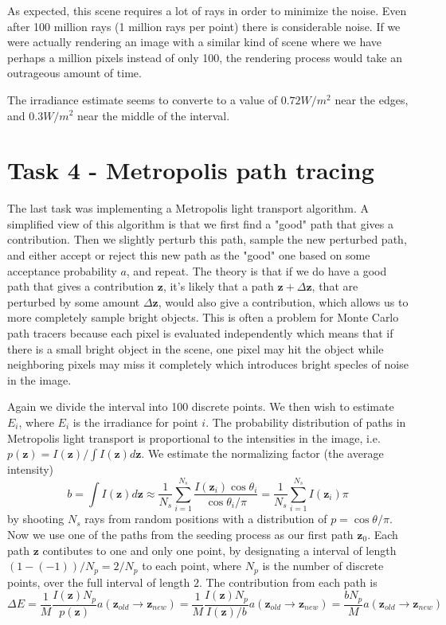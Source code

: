 \documentclass{article} %
\begin{document}
As expected, this scene requires a lot of rays in order to minimize the noise. Even after 100 million rays (1 million rays per point) there is considerable noise. If we were actually rendering an image with a similar kind of scene where we have perhaps a million pixels instead of only 100, the rendering process would take an outrageous amount of time.

The irradiance estimate seems to converte to a value of $0.72W/m^2$ near the edges, and $0.3W/m^2$ near the middle of the interval.



\section*{Task 4 - Metropolis path tracing}
The last task was implementing a Metropolis light transport algorithm. A simplified view of this algorithm is that we first find a "good" path that gives a contribution. Then we slightly perturb this path, sample the new perturbed path, and either accept or reject this new path as the "good" one based on some acceptance probability $a$, and repeat. The theory is that if we do have a good path that gives a contribution $\mathbf{z}$, it's likely that a path $\mathbf{z}+\Delta \mathbf{z}$, that are perturbed by some amount $\Delta \mathbf{z}$, would also give a contribution, which allows us to more completely sample bright objects. This is often a problem for Monte Carlo path tracers because each pixel is evaluated independently which means that if there is a small bright object in the scene, one pixel may hit the object while neighboring pixels may miss it completely which introduces bright specles of noise in the image. 

Again we divide the interval into 100 discrete points. We then wish to estimate $E_i$, where $E_i$ is the irradiance for point $i$. The probability distribution of paths in Metropolis light transport is proportional to the intensities in the image, i.e. $p(\mathbf{z}) = I(\mathbf{z})/{\int I(\mathbf{z})d\mathbf{z}}$. We estimate the normalizing factor (the average intensity) 
$$
b=\int I(\mathbf{z})d\mathbf{z}\approx \frac{1}{N_s}\sum_{i=1}^{N_s} \frac{I(\mathbf{z}_i) \cos \theta_i}{\cos \theta_i/\pi} = \frac{1}{N_s}\sum_{i=1}^{N_s} I(\mathbf{z}_i)\pi
$$
by shooting $N_s$ rays from random positions with a distribution of $p = \cos \theta/\pi$. Now we use one of the paths from the seeding process as our first path $\mathbf{z}_0$. Each path $\mathbf{z}$ contibutes to one and only one point, by designating a interval of length $(1- (-1))/N_p=2/N_p$ to each point, where $N_p$ is the number of discrete points, over the full interval of length $2$. The contribution from each path is 
$$\Delta E = \frac{1}{M} \frac{I(\mathbf{z})N_p}{p(\mathbf{z})}a(\mathbf{z}_{old}\to \mathbf{z}_{new}) = \frac{1}{M} \frac{I(\mathbf{z})N_p}{I(\mathbf{z})/b} a(\mathbf{z}_{old}\to \mathbf{z}_{new}) = \frac{bN_p}{M} a(\mathbf{z}_{old}\to \mathbf{z}_{new})$$ 
\end{document}
